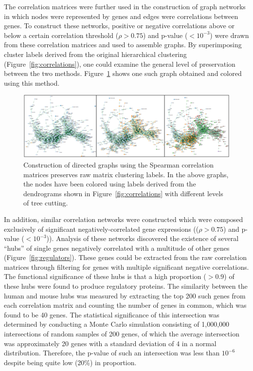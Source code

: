 \documentclass[12pt,oneside,onecolumn,a4paper]{article}
\begin{document}
The correlation matrices were further used in the construction of graph networks in which nodes were represented by genes and edges were correlations between genes. To construct these networks, positive or negative correlations above or below a certain correlation threshold ($\rho > 0.75$) and p-value ($<10^{-3}$) were drawn from these correlation matrices and used to assemble graphs. By superimposing cluster labels derived from the original hierarchical clustering (Figure~\ref{fig:correlations}), one could examine the general level of preservation between the two methods. Figure~\ref{fig:hierarchical_graph} shows one such graph obtained and colored using this method.

\begin{figure}[H]
\begin{center}
\includegraphics[width=\columnwidth]{figures/hierarchical_graph}
\caption{Construction of directed graphs using the Spearman correlation matrices preserves raw matrix clustering labels. In the above graphs, the nodes have been colored using labels derived from the dendrograms shown in Figure~\ref{fig:correlations} with different levels of tree cutting. \label{fig:hierarchical_graph}%
}
\end{center}
\end{figure}

In addition, similar correlation networks were constructed which were composed exclusively of significant negatively-correlated gene expressions (($\rho > 0.75$) and p-value ($<10^{-3}$)). Analysis of these networks discovered the existence of several ``hubs'' of single genes negatively correlated with a multitude of other genes (Figure~\ref{fig:regulators}). These genes could be extracted from the raw correlation matrices through filtering for genes with multiple significant negative correlations. The functional significance of these hubs is that a high proportion ($>0.9$) of these hubs were found to produce regulatory proteins. The similarity between the human and mouse hubs was measured by extracting the top 200 such genes from each correlation matrix and counting the number of genes in common, which was found to be 40 genes. The statistical significance of this intersection was determined by conducting a Monte Carlo simulation consisting of 1,000,000 intersections of random samples of 200 genes, of which the average intersection was approximately 20 genes with a standard deviation of 4 in a normal distribution. Therefore, the p-value of such an intersection was less than $10^{-6}$ despite being quite low (20\%) in proportion.
\end{document}
